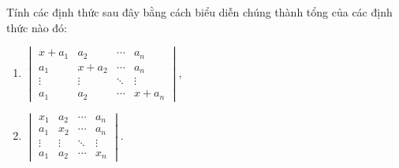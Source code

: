 \begin{exercise}
    Tính các định thức sau đây bằng cách biểu diễn chúng thành tổng của các định thức nào đó:
    \begin{enumerate}[label = (\alph*)]
        \item $\begin{vmatrix}
                      x + a_{1} & a_{2}     & \cdots & a_{n}     \\
                      a_{1}     & x + a_{2} & \cdots & a_{n}     \\
                      \vdots    & \vdots    & \ddots & \vdots    \\
                      a_{1}     & a_{2}     & \cdots & x + a_{n}
                  \end{vmatrix}$,
        \item $\begin{vmatrix}
                      x_{1}  & a_{2}  & \cdots & a_{n}  \\
                      a_{1}  & x_{2}  & \cdots & a_{n}  \\
                      \vdots & \vdots & \ddots & \vdots \\
                      a_{1}  & a_{2}  & \cdots & x_{n}
                  \end{vmatrix}$.
    \end{enumerate}
\end{exercise}


